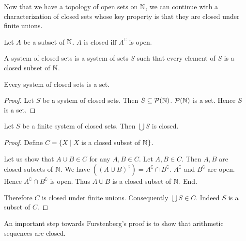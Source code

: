 \documentclass{article}
\begin{document}
  Now that we have a topology of open sets on $\mathbb{N}$, we can continue
  with a characterization of closed sets whose key property is that they are
  closed under finite unions.

  \begin{forthel}
    \begin{definition}
      Let $A$ be a subset of $\mathbb{N}$.
      $A$ is closed iff $A^{\complement}$ is open.
    \end{definition}

    \begin{definition}
      A system of closed sets is a system of sets $S$ such that every element of
      $S$ is a closed subset of $\mathbb{N}$.
    \end{definition}

    \begin{lemma}
      Every system of closed sets is a set.
    \end{lemma}
    \begin{proof}
      Let $S$ be a system of closed sets.
      Then $S \subseteq \mathcal{P}(\mathbb{N})$.
      $\mathcal{P}(\mathbb{N})$ is a set.
      Hence $S$ is a set.
    \end{proof}

    \begin{lemma}
      Let $S$ be a finite system of closed sets.
      Then $\bigcup S$ is closed.
    \end{lemma}
    \begin{proof}
      Define $C = \{ X \mid X$ is a closed subset of $\mathbb{N} \}$.

      Let us show that $A \cup B \in C$ for any $A, B \in C$.
        Let $A, B \in C$.
        Then $A, B$ are closed subsets of $\mathbb{N}$.
        We have $((A \cup B)^{\complement}) = A^{\complement} \cap B^{\complement}$.
        $A^{\complement}$ and $B^{\complement}$ are open.
        Hence $A^{\complement} \cap B^{\complement}$ is open.
        Thus $A \cup B$ is a closed subset of $\mathbb{N}$.
      End.

      Therefore $C$ is closed under finite unions.
      Consequently $\bigcup S \in C$.
      Indeed $S$ is a subset of $C$.
    \end{proof}
  \end{forthel}

  An important step towards Furstenberg's proof is to show that arithmetic
  sequences are closed.
\end{document}
